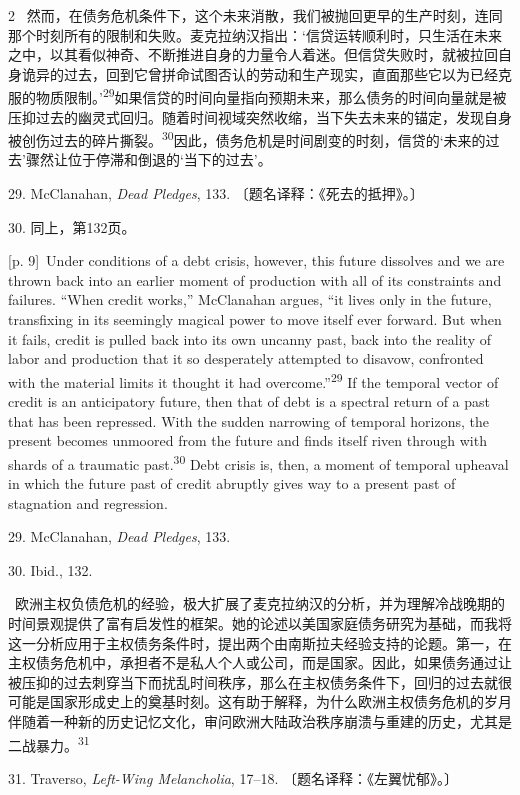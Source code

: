 \documentclass[10pt,a4paper]{article}
\begin{document}
\begin{paracol}{2}
\switchcolumn*
{\scriptsize\color{gray} [p. 9]}\ 然而，在债务危机条件下，这个未来消散，我们被抛回更早的生产时刻，连同那个时刻所有的限制和失败。麦克拉纳汉指出：‘信贷运转顺利时，只生活在未来之中，以其看似神奇、不断推进自身的力量令人着迷。但信贷失败时，就被拉回自身诡异的过去，回到它曾拼命试图否认的劳动和生产现实，直面那些它以为已经克服的物质限制。’\nobreak\textsuperscript{29}如果信贷的时间向量指向预期未来，那么债务的时间向量就是被压抑过去的幽灵式回归。随着时间视域突然收缩，当下失去未来的锚定，发现自身被创伤过去的碎片撕\mbox{裂。\textsuperscript{30}}因此，债务危机是时间剧变的时刻，信贷的‘未来的过去’骤然让位于停滞和倒退的‘当下的过去’。\par{\small 29. McClanahan, \textit{Dead Pledges}, 133. 〔题名译释：《死去的抵押》。〕\par}{\small 30. 同上，第132页。\par}
\switchcolumn
{\scriptsize\color{gray} [p. 9]}\ Under conditions of a debt crisis, however, this future dissolves and we are thrown back into an earlier moment of production with all of its constraints and failures. “When credit works,” McClanahan argues, “it lives only in the future, transfixing in its seemingly magical power to move itself ever forward. But when it fails, credit is pulled back into its own uncanny past, back into the reality of labor and production that it so desperately attempted to disavow, confronted with the material limits it thought it had overcome.”\nobreak\textsuperscript{29} If the temporal vector of credit is an anticipatory future, then that of debt is a spectral return of a past that has been repressed. With the sudden narrowing of temporal horizons, the present becomes unmoored from the future and finds itself riven through with shards of a traumatic past.\nobreak\textsuperscript{30} Debt crisis is, then, a moment of temporal upheaval in which the future past of credit abruptly gives way to a present past of stagnation and regression.\par{\small 29. McClanahan, \textit{Dead Pledges}, 133.\par}{\small 30. Ibid., 132.\par}
\switchcolumn*
{\scriptsize\color{gray} [p. 9]}\ 欧洲主权负债危机的经验，极大扩展了麦克拉纳汉的分析，并为理解冷战晚期的时间景观提供了富有启发性的框架。她的论述以美国家庭债务研究为基础，而我将这一分析应用于主权债务条件时，提出两个由南斯拉夫经验支持的论题。第一，在主权债务危机中，承担者不是私人个人或公司，而是国家。因此，如果债务通过让被压抑的过去刺穿当下而扰乱时间秩序，那么在主权债务条件下，回归的过去就很可能是国家形成史上的奠基时刻。这有助于解释，为什么欧洲主权债务危机的岁月伴随着一种新的历史记忆文化，审问欧洲大陆政治秩序崩溃与重建的历史，尤其是二战暴\mbox{力。\textsuperscript{31}}\par{\small 31. Traverso, \textit{Left-Wing Melancholia}, 17–18. 〔题名译释：《左翼忧郁》。〕\par}

\end{paracol}
\end{document}
